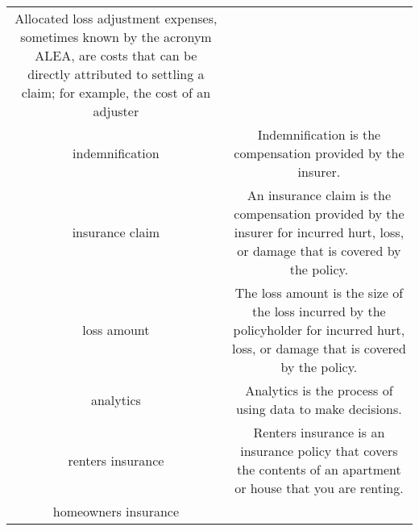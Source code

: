 \documentclass[
]{book}
\begin{document}
\begin{longtable}[]{@{}cc@{}}
\begin{minipage}[t]{0.43\columnwidth}
Allocated loss adjustment
expenses, sometimes known by
the acronym ALEA, are costs
that can be directly
attributed to settling a
claim; for example, the cost
of an adjuster\strut
\end{minipage}\tabularnewline
\begin{minipage}[t]{0.39\columnwidth}\centering
indemnification\strut
\end{minipage} & \begin{minipage}[t]{0.43\columnwidth}\centering
Indemnification is the
compensation provided by the
insurer.\strut
\end{minipage}\tabularnewline
\begin{minipage}[t]{0.39\columnwidth}\centering
insurance claim\strut
\end{minipage} & \begin{minipage}[t]{0.43\columnwidth}\centering
An insurance claim is the
compensation provided by the
insurer for incurred hurt,
loss, or damage that is
covered by the policy.\strut
\end{minipage}\tabularnewline
\begin{minipage}[t]{0.39\columnwidth}\centering
loss amount\strut
\end{minipage} & \begin{minipage}[t]{0.43\columnwidth}\centering
The loss amount is the size of
the loss incurred by the
policyholder for incurred
hurt, loss, or damage that is
covered by the policy.\strut
\end{minipage}\tabularnewline
\begin{minipage}[t]{0.39\columnwidth}\centering
analytics\strut
\end{minipage} & \begin{minipage}[t]{0.43\columnwidth}\centering
Analytics is the process of
using data to make decisions.\strut
\end{minipage}\tabularnewline
\begin{minipage}[t]{0.39\columnwidth}\centering
renters insurance\strut
\end{minipage} & \begin{minipage}[t]{0.43\columnwidth}\centering
Renters insurance is an
insurance policy that covers
the contents of an apartment
or house that you are renting.\strut
\end{minipage}\tabularnewline
\begin{minipage}[t]{0.39\columnwidth}\centering
homeowners insurance\strut
\end{minipage} & \begin{minipage}[t]{0.43\columnwidth}\centering

\end{minipage}
\end{longtable}
\end{document}
